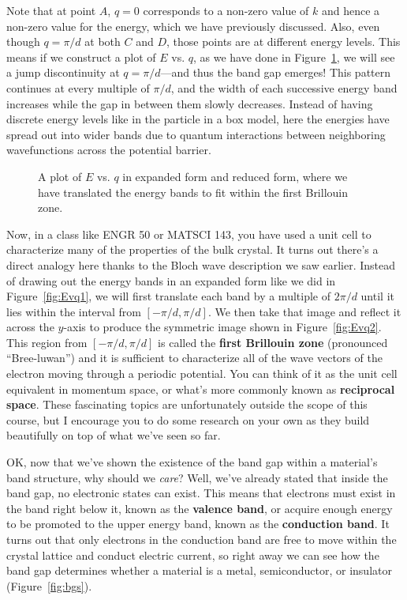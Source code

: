 Note that at point $A$, $q=0$ corresponds to a non-zero value of $k$ and hence a non-zero value for the energy, which we have previously discussed. Also, even though $q=\pi/d$ at both $C$ and $D$, those points are at different energy levels. This means if we construct a plot of $E$ vs. $q$, as we have done in Figure~\ref{fig:Evq}, we will see a jump discontinuity at $q=\pi/d$---and thus the band gap emerges! This pattern continues at every multiple of $\pi/d$, and the width of each successive energy band increases while the gap in between them slowly decreases. Instead of having discrete energy levels like in the particle in a box model, here the energies have spread out into wider bands due to quantum interactions between neighboring wavefunctions across the potential barrier.

\begin{figure}[!h]
	\centering
	\hfill
	\caption{A plot of $E$ vs. $q$ in \protect{} expanded form and \protect{} reduced form, where we have translated the energy bands to fit within the first Brillouin zone.}
	\label{fig:Evq}
\end{figure}

Now, in a class like ENGR 50 or MATSCI 143, you have used a unit cell to characterize many of the properties of the bulk crystal. It turns out there's a direct analogy here thanks to the Bloch wave description we saw earlier. Instead of drawing out the energy bands in an expanded form like we did in Figure~\ref{fig:Evq1}, we will first translate each band by a multiple of $2\pi/d$ until it lies within the interval from $[-\pi/d, \pi/d]$. We then take that image and reflect it across the $y$-axis to produce the symmetric image shown in Figure~\ref{fig:Evq2}. This region from $[-\pi/d, \pi/d]$ is called the \textbf{first Brillouin zone} (pronounced ``Bree-luwan'') and it is sufficient to characterize all of the wave vectors of the electron moving through a periodic potential. You can think of it as the unit cell equivalent in momentum space, or what's more commonly known as \textbf{reciprocal space}. These fascinating topics are unfortunately outside the scope of this course, but I encourage you to do some research on your own as they build beautifully on top of what we've seen so far. \par 

OK, now that we've shown the existence of the band gap within a material's band structure, why should we \emph{care}? Well, we've already stated that inside the band gap, no electronic states can exist. This means that electrons must exist in the band right below it, known as the \textbf{valence band}, or acquire enough energy to be promoted to the upper energy band, known as the \textbf{conduction band}. It turns out that only electrons in the conduction band are free to move within the crystal lattice and conduct electric current, so right away we can see how the band gap determines whether a material is a metal, semiconductor, or insulator (Figure~\ref{fig:bgs}).


